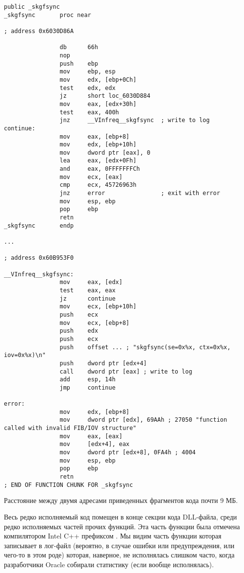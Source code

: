 \begin{lstlisting}[caption=orageneric11.dll (win32)]
                public _skgfsync
_skgfsync       proc near

; address 0x6030D86A

                db      66h
                nop
                push    ebp
                mov     ebp, esp
                mov     edx, [ebp+0Ch]
                test    edx, edx
                jz      short loc_6030D884
                mov     eax, [edx+30h]
                test    eax, 400h
                jnz     __VInfreq__skgfsync  ; write to log
continue:
                mov     eax, [ebp+8]
                mov     edx, [ebp+10h]
                mov     dword ptr [eax], 0
                lea     eax, [edx+0Fh]
                and     eax, 0FFFFFFFCh
                mov     ecx, [eax]
                cmp     ecx, 45726963h
                jnz     error                ; exit with error
                mov     esp, ebp
                pop     ebp
                retn
_skgfsync       endp

...

; address 0x60B953F0

__VInfreq__skgfsync:
                mov     eax, [edx]
                test    eax, eax
                jz      continue
                mov     ecx, [ebp+10h]
                push    ecx
                mov     ecx, [ebp+8]
                push    edx
                push    ecx
                push    offset ... ; "skgfsync(se=0x%x, ctx=0x%x, iov=0x%x)\n"
                push    dword ptr [edx+4]
                call    dword ptr [eax] ; write to log
                add     esp, 14h
                jmp     continue

error:
                mov     edx, [ebp+8]
                mov     dword ptr [edx], 69AAh ; 27050 "function called with invalid FIB/IOV structure"
                mov     eax, [eax]
                mov     [edx+4], eax
                mov     dword ptr [edx+8], 0FA4h ; 4004
                mov     esp, ebp
                pop     ebp
                retn
; END OF FUNCTION CHUNK FOR _skgfsync
\end{lstlisting}

Расстояние между двумя адресами приведенных фрагментов кода почти 9 МБ.

Весь редко исполняемый код помещен в конце секции кода DLL-файла, среди редко
исполняемых частей прочих функций.
Эта часть функции была отмечена компилятором Intel C++ префиксом .
Мы видим часть функции которая записывает в лог-файл (вероятно, в случае ошибки или предупреждения,
или чего-то в этом роде) которая, наверное, не исполнялась слишком часто, когда разработчики Oracle
собирали статистику (если вообще исполнялась).

